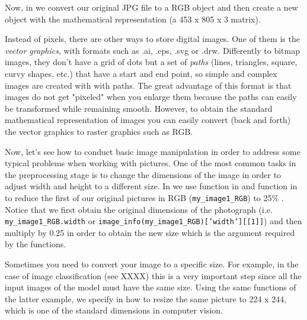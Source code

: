 Now, in  we convert our original JPG file to a RGB object and then create a new object with the mathematical representation (a 453 x 805 x 3 matrix).


Instead of pixels, there are other ways to store digital images. One of them is the \textit{vector graphics}, with formats such as .ai, .eps, .svg or .drw. Differently to bitmap images, they don't have a grid of dots but a set of \textit{paths} (lines, triangles, square, curvy shapes, etc.) that have a start and end point, so simple and complex images are created with with paths. The great advantage of this format is that images do not get "pixeled" when you enlarge them because the paths can easily be transformed 	while remaining smooth. However, to obtain the standard mathematical representation of images you can easily convert (back and forth) the vector graphics to raster graphics such as RGB.

Now, let's see how to conduct basic image manipulation in order to address some typical problems when working with pictures. One of the most common tasks in the preprocessing stage is to change the dimensions of the image in order to adjust width and height to a different size. In  we use  function in  and  function in  to reduce the first of our original pictures in RGB (\texttt{my_image1_RGB}) to 25\% . Notice that we first obtain the original dimensions of the photograph (i.e. \texttt{my\_image1\_RGB.width} or \texttt{image_info(my\_image1\_RGB)['width'][[1]]}) and then multiply by 0.25 in order to obtain the new size which is the argument required by the functions.


Sometimes you need to convert your image to a specific size. For example, in the case of image classification (see XXXX) this is a very important step since all the input images of the model must have the same size. Using the same functions of the latter example, we specify in  how to resize the same picture to 224 x 244, which is one of the standard dimensions in computer vision. 


